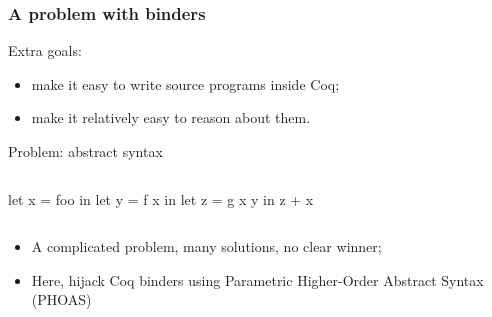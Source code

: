 \documentclass[9pt]{beamer}
\begin{document}
\begin{frame}[fragile]
  \frametitle{A problem with binders}
  
  \alert{Extra goals:}
  \begin{itemize}
  \item make it easy to write source programs inside Coq;
  \item make it relatively easy to reason about them. 
  \end{itemize}

  \alert{Problem: abstract syntax}
\begin{center}
\vspace{-1em}
  \begin{columns}
\begin{ocaml}
let x = foo in 
let y = f x in 
let z = g x y in 
z + x
\end{ocaml}
\end{columns}
\end{center}

\pause 
\begin{itemize}
\item A complicated problem, many solutions, no clear winner;
\item Here, hijack Coq binders using Parametric Higher-Order
  Abstract Syntax (PHOAS)
\end{itemize}
\end{frame}



\end{document}
